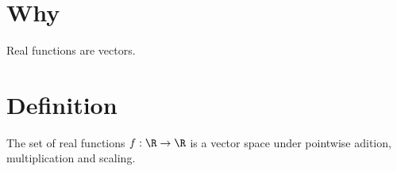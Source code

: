 

    \section*{Why}


Real functions are vectors.

    \section*{Definition}


The set of real functions $f: \R  \to \R $ is a vector space under pointwise adition, multiplication and scaling.

\blankpage
